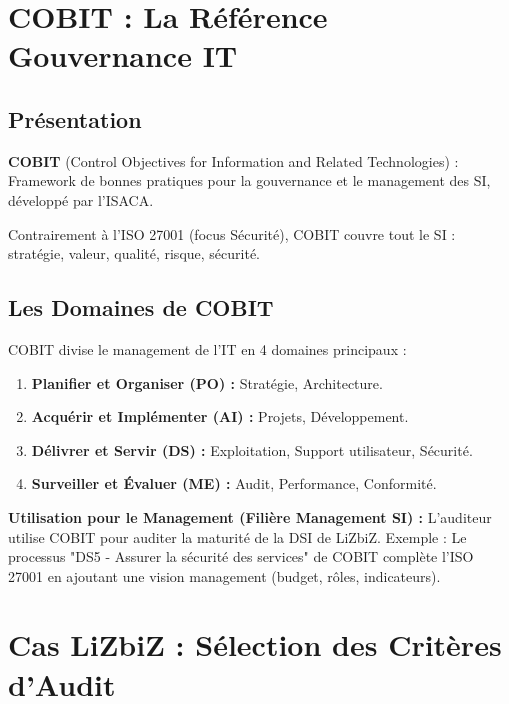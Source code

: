 \section{COBIT : La Référence Gouvernance IT}

\subsection{Présentation}

\begin{boxdef}
\textbf{COBIT} (Control Objectives for Information and Related Technologies) : Framework de bonnes pratiques pour la gouvernance et le management des SI, développé par l'ISACA.
\end{boxdef}

Contrairement à l'ISO 27001 (focus Sécurité), COBIT couvre tout le SI : stratégie, valeur, qualité, risque, sécurité.

\subsection{Les Domaines de COBIT}

COBIT divise le management de l'IT en 4 domaines principaux :
\begin{enumerate}
    \item \textbf{Planifier et Organiser (PO) :} Stratégie, Architecture.
    \item \textbf{Acquérir et Implémenter (AI) :} Projets, Développement.
    \item \textbf{Délivrer et Servir (DS) :} Exploitation, Support utilisateur, Sécurité.
    \item \textbf{Surveiller et Évaluer (ME) :} Audit, Performance, Conformité.
\end{enumerate}

\begin{boxlizbiz}
\textbf{Utilisation pour le Management (Filière Management SI) :}
L'auditeur utilise COBIT pour auditer la maturité de la DSI de LiZbiZ.
Exemple : Le processus "DS5 - Assurer la sécurité des services" de COBIT complète l'ISO 27001 en ajoutant une vision management (budget, rôles, indicateurs).
\end{boxlizbiz}

\section{Cas LiZbiZ : Sélection des Critères d'Audit}

